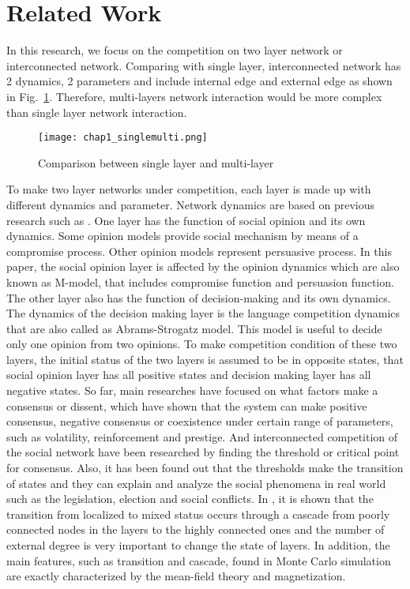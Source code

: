 \section{Related Work}
In this research, we focus on the competition on two layer network or interconnected network. Comparing with single layer, interconnected network has 2 dynamics, 2 parameters and include internal edge and external edge as shown in Fig.~\ref{chap1_singlemulti}. Therefore, multi-layers network interaction would be more complex than single layer network interaction.
\begin{figure}[!htb]
	\centering
	\texttt{[image: chap1\_singlemulti.png]}
	\caption{Comparison between single layer and multi-layer}
	\label{chap1_singlemulti}
\end{figure}
To make two layer networks under competition, each layer is made up with different dynamics and parameter. Network dynamics are based on previous research such as \parencite{alvarez2016}. One layer has the function of social opinion and its own dynamics. Some opinion models provide social mechanism by means of a compromise process.\parencite{naim2003} Other opinion models represent persuasive process.\parencite{chau2014} In this paper, the social opinion layer is affected by the opinion dynamics which are also known as M-model\parencite{rocca2014}, that includes compromise function and persuasion function. The other layer also has the function of decision-making and its own dynamics. The dynamics of the decision making layer is the language competition dynamics that are also called as Abrams-Strogatz model\parencite{abrams2003, vazquez2010, patriarca2012}. This model is useful to decide only one opinion from two opinions. To make competition condition of these two layers, the initial status of the two layers is assumed to be in opposite states, that social opinion layer has all positive states and decision making layer has all negative states.
So far, main researches have focused on what factors make a consensus or dissent, which have shown that the system can make positive consensus, negative consensus or coexistence under certain range of parameters, such as volatility, reinforcement and prestige.\parencite{alvarez2016} And interconnected competition of the social network have been researched by finding the threshold or critical point for consensus.\parencite{alvarez2016, gomez2015, diep2017}
Also, it has been found out that the thresholds make the transition of states and they can explain and analyze the social phenomena in real world such as the legislation, election and social conflicts.\parencite{alvarez2016, amato2017, diep2017} In \parencite{gomez2015}, it is shown that the transition from localized to mixed status occurs through a cascade from poorly connected nodes in the layers to the highly connected ones and the number of external degree is very important to change the state of layers. In addition, the main features, such as transition and cascade, found in Monte Carlo simulation are exactly characterized by the mean-field theory and magnetization\parencite{alvarez2016, diep2017, amato2017, gomez2015}. 

